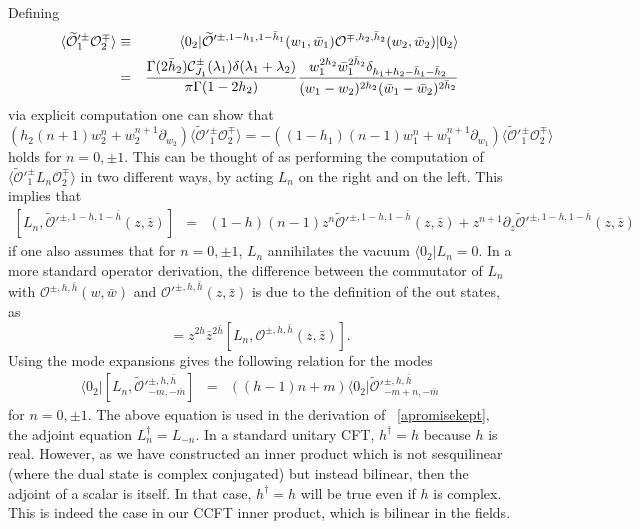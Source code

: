 \documentclass[11pt]{article}
\numberwithin{equation}{section}
\begin{document}
Defining
\begin{eqnarray}
\langle \widetilde{\mathcal{O}}'^{\pm}_1\mathcal{O}_2^{\mp}\rangle & \equiv & \langle 0_2| \widetilde{\mathcal{O}}'^{\pm,1-h_1,1-\bar{h}_1}(w_1,\bar{w}_1)\mathcal{O}^{\mp,h_2,\bar{h}_2}(w_2,\bar{w}_2)|0_2\rangle\cr
& = & \frac{\Gamma(2\bar{h}_2)\mathcal{C}^{\pm}_{J_1}(\lambda_1)\delta(\lambda_1+\lambda_2)}{\pi\Gamma(1-2h_2)}\frac{w_1^{2h_2}\bar{w}_1^{2\bar{h}_2}\delta_{h_1+h_2-\bar{h}_1-\bar{h}_2}}{(w_1 - w_2)^{2h_2} (\bar{w}_1 - \bar{w}_2 )^{2 \bar{h}_2 }}
\end{eqnarray}
via explicit computation one can show that
\begin{equation}\label{Lnoutside}
(h_2(n+1)w_2^n+w_2^{n+1}\partial_{w_2})\langle \widetilde{\mathcal{O}}'^{\pm}_1\mathcal{O}^{\mp}_2\rangle = -((1-h_1)(n-1)w_1^n+w_1^{n+1}\partial_{w_1})\langle \widetilde{\mathcal{O}}'^\pm_1\mathcal{O}_2^\mp\rangle
\end{equation}
holds for $n=0,\pm 1$. This can be thought of as performing the computation of $\langle \widetilde{\mathcal{O}}'^\pm_1 L_n \mathcal{O}_2^\mp\rangle$ in two different ways, by acting $L_n$ on the right and on the left. This implies that
\begin{eqnarray}\label{Ln_in}
[L_n, \widetilde{\mathcal{O}}'^{\pm,1-h,1-\bar{h}}(z,\bar{z})] & = & (1-h)(n-1)z^n\widetilde{\mathcal{O}}'^{\pm,1-h,1-\bar{h}}(z,\bar{z})+z^{n+1}\partial_z\widetilde{\mathcal{O}}'^{\pm,1-h,1-\bar{h}}(z,\bar{z})
\end{eqnarray}
if one also assumes that for $n = 0, \pm1$, $L_n$ annihilates the vacuum $\langle 0_2 | L_n = 0$. In a more standard operator derivation, the difference between the commutator of $L_n$ with $\mathcal{O}^{\pm,h,\bar{h}}(w,\bar{w})$ and $\mathcal{O}'^{\pm,h,\bar{h}}(z,\bar{z})$ is due to the definition of the out states, as
\begin{equation}
    [L_n,  \mathcal{O}'^{\pm,h,\bar{h}}(z, \bar{z}) ] = z^{2h}\bar{z}^{2\bar{h}}[L_n, \mathcal{O}^{\pm,h,\bar{h}}(z, \bar{z})].
\end{equation}
Using the mode expansions gives the following relation for the modes
\begin{eqnarray}\label{eq_Lonmode}
     \langle 0_2|[L_n\mathcal,\widetilde{\mathcal{O}}'^{\pm,h,\bar{h}}_{-m,-\bar{m}}] & = & ((h-1)n+m)\langle 0_2|\widetilde{\mathcal{O}}'^{\pm,h,\bar{h}}_{-m+n,-\bar{m}}
\end{eqnarray}
for $n = 0, \pm 1$. The above equation is used in the derivation of ~\eqref{apromisekept}, the adjoint equation $L_n^\dagger = L_{-n}$. In a standard unitary CFT, $h^\dagger = h$ because $h$ is real. However, as we have constructed an inner product which is not sesquilinear (where the dual state is complex conjugated) but instead bilinear, then the adjoint of a scalar is itself. In that case, $h^\dagger = h$ will be true even if $h$ is complex. This is indeed the case in our CCFT inner product, which is bilinear in the fields.






\end{document}
